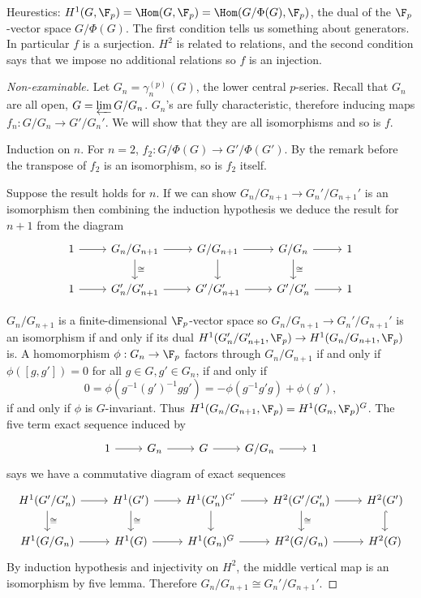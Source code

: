 \documentclass[a4paper]{article}
\begin{document}
Heurestics: \(H^1(G, \F_p) = \Hom(G, \F_p) = \Hom(G/\Phi(G), \F_p)\), the dual of the \(\F_p\)-vector space \(G/\Phi(G)\). The first condition tells us something about generators. In particular \(f\) is a surjection. \(H^2\) is related to relations, and the second condition says that we impose no additional relations so \(f\) is an injection.

\begin{proof}[Non-examinable]
  Let \(G_n = \gamma_n^{(p)}(G)\), the lower central \(p\)-series. Recall that \(G_n\) are all open, \(G = \varprojlim G/G_n\). \(G_n\)'s are fully characteristic, therefore inducing maps \(f_n: G/G_n \to G'/G_n'\). We will show that they are all isomorphisms and so is \(f\).

  Induction on \(n\). For \(n = 2\), \(f_2: G/\Phi(G) \to G'/\Phi(G')\). By the remark before the transpose of \(f_2\) is an isomorphism, so is \(f_2\) itself.

  Suppose the result holds for \(n\). If we can show \(G_n/G_{n + 1} \to G_n'/G_{n + 1}'\) is an isomorphism then combining the induction hypothesis we deduce the result for \(n + 1\) from the diagram
  \[
    \begin{tikzcd}
      1 \ar[r] & G_n/G_{n + 1} \ar[r] \ar[d, "\cong"] & G/G_{n + 1} \ar[r] \ar[d] & G/G_n \ar[r] \ar[d, "\cong"] & 1 \\
      1 \ar[r] & G_n'/G_{n + 1}' \ar[r] & G'/G_{n + 1}' \ar[r] & G'/G_n' \ar[r] & 1
    \end{tikzcd}
  \]

  \(G_n/G_{n + 1}\) is a finite-dimensional \(\F_p\)-vector space so \(G_n/G_{n + 1} \to G_n'/G_{n + 1}'\) is an isomorphism if and only if its dual \(H^1(G_n'/G_{n + 1}', \F_p) \to H^1(G_n/G_{n + 1}, \F_p)\) is. A homomorphism \(\phi: G_n \to \F_p\) factors through \(G_n/G_{n + 1}\) if and only if \(\phi([g, g']) = 0\) for all \(g \in G, g' \in G_n\), if and only if
  \[
    0 = \phi(g^{-1}(g')^{-1}gg') = - \phi(g^{-1}g'g) + \phi(g'),
  \]
  if and only if \(\phi\) is \(G\)-invariant. Thus \(H^1(G_n/G_{n + 1}, \F_p) = H^1(G_n, \F_p)^G\). The five term exact sequence induced by
  \[
    \begin{tikzcd}
      1 \ar[r] & G_n \ar[r] & G \ar[r] & G/G_n \ar[r] & 1
    \end{tikzcd}
  \]
  says we have a commutative diagram of exact sequences
  \[
    \begin{tikzcd}
      H^1(G'/G'_n) \ar[r] \ar[d, "\cong"] & H^1(G') \ar[r] \ar[d, "\cong"] & H^1(G'_n)^{G'} \ar[r] \ar[d] & H^2(G'/G'_n) \ar[r] \ar[d, "\cong"] & H^2(G') \ar[d, hook] \\
      H^1(G/G_n) \ar[r] & H^1(G) \ar[r] & H^1(G_n)^G \ar[r] & H^2(G/G_n) \ar[r] & H^2(G)
    \end{tikzcd}
  \]
  By induction hypothesis and injectivity on \(H^2\), the middle vertical map is an isomorphism by five lemma. Therefore \(G_n/G_{n + 1} \cong G_n'/G_{n + 1}'\).
\end{proof}
\end{document}
